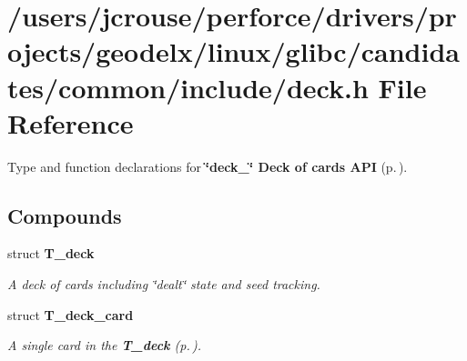 \section{/users/jcrouse/perforce/drivers/projects/geodelx/linux/glibc/candidates/common/include/deck.h File Reference}
\label{deck_8h}
Type and function declarations for {\bf \char`\"{}deck\_\-\char`\"{} Deck of cards API} {\rm (p.\,\pageref{group__deck})}. 


\subsection*{Compounds}
\begin{CompactItemize}
\item 
struct {\bf T\_\-deck}
\begin{CompactList}\small\item\em A deck of cards including \char`\"{}dealt\char`\"{} state and seed tracking.\item\end{CompactList}\item 
struct {\bf T\_\-deck\_\-card}
\begin{CompactList}\small\item\em A single card in the {\bf T\_\-deck} {\rm (p.\,\pageref{structT__deck})}.\item\end{CompactList}\end{CompactItemize}
